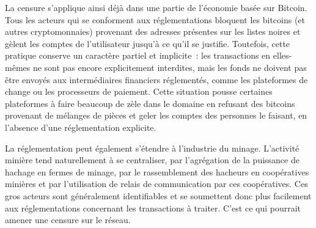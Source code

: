 La censure s'applique ainsi déjà dans une partie de l'économie basée sur Bitcoin. Tous les acteurs qui se conforment aux réglementations bloquent les bitcoins (et autres cryptomonnaies) provenant des adresses présentes sur les listes noires et gèlent les comptes de l'utilisateur jusqu'à ce qu'il se justifie. Toutefois, cette pratique conserve un caractère partiel et implicite~: les transactions en elles-mêmes ne sont pas encore explicitement interdites, mais les fonds ne doivent pas être envoyés aux intermédiaires financiers réglementés, comme les plateformes de change ou les processeurs de paiement. Cette situation pousse certaines plateformes à faire beaucoup de zèle dans le domaine en refusant des bitcoins provenant de mélanges de pièces et geler les comptes des personnes le faisant, en l'absence d'une réglementation explicite.

La réglementation peut également s'étendre à l'industrie du minage. L'activité minière tend naturellement à se centraliser, par l'agrégation de la puissance de hachage en fermes de minage, par le rassemblement des hacheurs en coopératives minières et par l'utilisation de relais de communication par ces coopératives. Ces gros acteurs sont généralement identifiables et se soumettent donc plus facilement aux réglementations concernant les transactions à traiter. C'est ce qui pourrait amener une censure sur le réseau.

